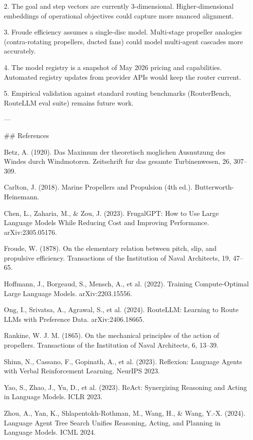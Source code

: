 2. The goal and step vectors are currently 3-dimensional. Higher-dimensional embeddings of operational objectives could capture more nuanced alignment.

3. Froude efficiency assumes a single-disc model. Multi-stage propeller analogies (contra-rotating propellers, ducted fans) could model multi-agent cascades more accurately.

4. The model registry is a snapshot of May 2026 pricing and capabilities. Automated registry updates from provider APIs would keep the router current.

5. Empirical validation against standard routing benchmarks (RouterBench, RouteLLM eval suite) remains future work.

---

## References

Betz, A. (1920). Das Maximum der theoretisch moglichen Ausnutzung des Windes durch Windmotoren. Zeitschrift fur das gesamte Turbinenwesen, 26, 307--309.

Carlton, J. (2018). Marine Propellers and Propulsion (4th ed.). Butterworth-Heinemann.

Chen, L., Zaharia, M., & Zou, J. (2023). FrugalGPT: How to Use Large Language Models While Reducing Cost and Improving Performance. arXiv:2305.05176.

Froude, W. (1878). On the elementary relation between pitch, slip, and propulsive efficiency. Transactions of the Institution of Naval Architects, 19, 47--65.

Hoffmann, J., Borgeaud, S., Mensch, A., et al. (2022). Training Compute-Optimal Large Language Models. arXiv:2203.15556.

Ong, I., Srivatsa, A., Agrawal, S., et al. (2024). RouteLLM: Learning to Route LLMs with Preference Data. arXiv:2406.18665.

Rankine, W. J. M. (1865). On the mechanical principles of the action of propellers. Transactions of the Institution of Naval Architects, 6, 13--39.

Shinn, N., Cassano, F., Gopinath, A., et al. (2023). Reflexion: Language Agents with Verbal Reinforcement Learning. NeurIPS 2023.

Yao, S., Zhao, J., Yu, D., et al. (2023). ReAct: Synergizing Reasoning and Acting in Language Models. ICLR 2023.

Zhou, A., Yan, K., Shlapentokh-Rothman, M., Wang, H., & Wang, Y.-X. (2024). Language Agent Tree Search Unifies Reasoning, Acting, and Planning in Language Models. ICML 2024.

